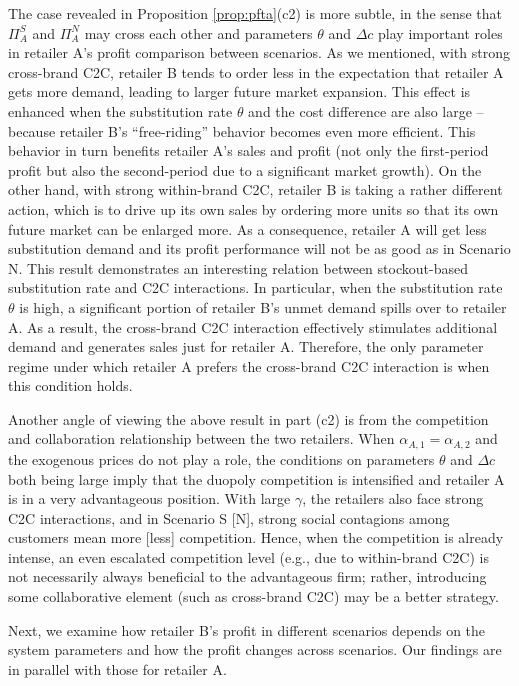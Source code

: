 \documentclass[nonblindrev,copyedit]{informs1}
\begin{document}
The case revealed in Proposition \ref{prop:pfta}(c2) is more subtle, in the sense that $\Pi^S_{A}$ and $\Pi^N_{A}$ may cross each other and parameters $\theta$ and $\Delta c$ play important roles in retailer A's profit comparison between scenarios.
As we mentioned, with strong cross-brand C2C, retailer B tends to order less in the expectation that retailer A gets more demand, leading to larger future market expansion. This effect is enhanced when the substitution rate $\theta$ and the cost difference are also large -- because retailer B's ``free-riding'' behavior becomes even more efficient. This behavior in turn benefits retailer A's sales and profit (not only the first-period profit but also the second-period due to a significant market growth). On the other hand, with strong within-brand C2C, retailer B is taking a rather different action, which is to drive up its own sales by ordering more units so that its own future market can be enlarged more. As a consequence, retailer A will get less substitution demand and its profit performance will not be as good as in Scenario N.
This result demonstrates an interesting relation between stockout-based substitution rate and C2C interactions. In particular, when the substitution rate $\theta$ is high, a significant portion of retailer B's unmet demand spills over to retailer A. As a result, the cross-brand C2C interaction effectively stimulates additional demand and generates sales just for retailer A. Therefore, the only parameter regime under which retailer A prefers the cross-brand C2C interaction is when this condition holds.

Another angle of viewing the above result in part (c2) is from the competition and collaboration relationship between the two retailers.
When $\alpha_{A,1} = \alpha_{A,2}$ and the exogenous prices do not play a role, the conditions on parameters $\theta$ and $\Delta c$ both being large imply that the duopoly competition is intensified and retailer A is in a very advantageous position. With large $\gamma$, the retailers also face strong C2C interactions, and in Scenario S [N], strong social contagions among customers mean more [less] competition. Hence, when the competition is already intense, an even escalated competition level (e.g., due to within-brand C2C) is not necessarily always beneficial to the advantageous firm; rather, introducing some collaborative element (such as cross-brand C2C) may be a better strategy.

Next, we examine how retailer B's profit in different scenarios depends on the system parameters and how the profit changes across scenarios. Our findings are in parallel with those for retailer A.
\end{document}
